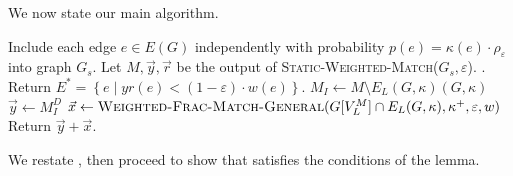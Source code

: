 \documentclass[a4paper,11pt]{article}
\newcommand{\card}[1]{|#1|}
\newcommand{\set}[1]{\ensuremath{\left\{ #1 \right\}}}
\newcommand{\eps}{\varepsilon}
\renewcommand{\algorithmicrequire}{\textbf{Input:}}
\renewcommand{\algorithmicensure}{\textbf{Output:}}
\theoremstyle{definition}
\theoremstyle{definition}
\theoremstyle{definition}
\theoremstyle{definition}
\theoremstyle{definition}
\theoremstyle{definition}
\theoremstyle{definition}
\theoremstyle{definition}
\theoremstyle{definition}
\theoremstyle{definition}
\theoremstyle{definition}
\theoremstyle{definition}
\theoremstyle{definition}
\theoremstyle{definition}
\theoremstyle{definition}
\begin{document}
 We now state our main algorithm.

\begin{algorithm}[H]
	\caption{\textsc{WeightedM-or-E*}($G,\kappa,\eps,\mu,w$)}
	\begin{algorithmic}[1]
		\State Include each edge $e\in E(G)$ independently with probability $p(e)=\kappa(e)\cdot \rho_{\eps}$ into graph $G_s$.
		\State Let $M,\vec{y},\vec{r}$ be the output of \textsc{Static-Weighted-Match}($G_s,\eps$). .
		\If{$w(M)\leqslant (1-6\eps)\cdot\textsf{mwm}(G)$}
		\State Return $E^*=\set{e\mid yr(e)<(1-\eps)\cdot w(e)}$. 
		\Else {}
		\State $M_I\leftarrow M\setminus E_{L}(G,\kappa)(G,\kappa)$\label{line:defineMI}
		\State $\vec{y}\leftarrow M_I^{D}$
		\State $\vec{x}\leftarrow \textsc{Weighted-Frac-Match-General}(G[V^M_L]\cap E_{L}(G,\kappa),\kappa^+, \eps,w)$ \label{item:wfm}
		\EndIf
		\State Return $\vec{y}+\vec{x}$. 
		\end{algorithmic}
	\label{alg:WeightedMorE}
\end{algorithm}

We restate , then proceed to show that  satisfies the conditions of the lemma. 

\MorE*
\end{document}
